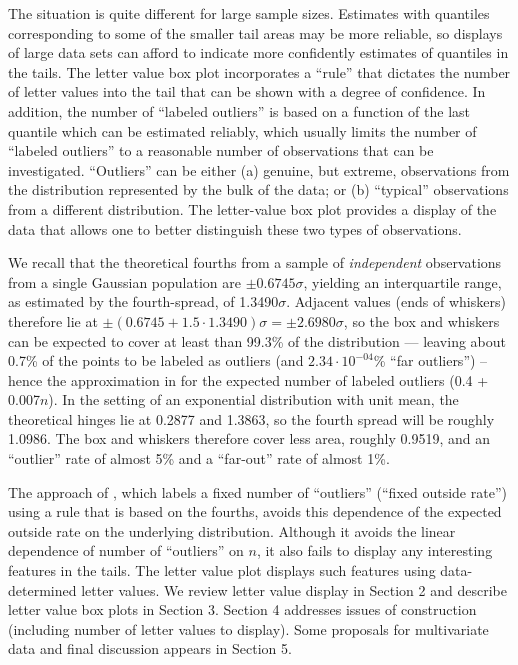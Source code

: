 \documentclass[oneside]{article}
\begin{document}
The situation is quite different for large sample sizes.
Estimates with quantiles corresponding to some of the smaller 
tail areas may be more reliable, so displays of large data sets 
can afford to indicate more confidently estimates of quantiles 
in the tails.  The letter
value box plot incorporates a ``rule'' that dictates the number of
letter values into the tail that can be shown with a degree of
confidence.  In addition, the number of ``labeled outliers'' is 
based on a function of the last quantile which can be estimated
reliably, which usually limits the number of ``labeled outliers'' 
to a reasonable number of observations that can be investigated.
``Outliers'' can be either (a) genuine, but extreme, observations
from the distribution represented by the bulk of the data; or 
(b) ``typical'' observations from a different distribution.
The letter-value box plot provides a display of the data that
allows one to better distinguish these two types of observations.

We recall that the theoretical fourths from a sample of
\textit{independent} observations from a single Gaussian 
population are $\pm  0.6745\sigma$, yielding an interquartile 
range, as estimated by the fourth-spread, of 1.3490$\sigma$.
Adjacent values (ends of whiskers) therefore lie at
$\pm (0.6745 + 1.5 \cdot 1.3490)\sigma = \pm 2.6980\sigma$,
so the box and whiskers can be expected to cover 
at least than 99.3\% of the distribution --- leaving 
about 0.7\% of the points to be labeled as outliers 
(and $2.34 \cdot 10^{-04}$\% ``far outliers'') -- hence the
approximation in \citet[34]{dchlv} for the expected 
number of labeled outliers (0.4 + 0.007$n$).
In the setting of an exponential distribution with unit mean, 
the theoretical hinges lie at 0.2877 and 1.3863, so the fourth
spread will be roughly 1.0986.  The box and whiskers therefore
cover less area, roughly 0.9519, and an ``outlier'' rate
of almost 5\% and a ``far-out'' rate of almost 1\%.

The approach of \citet{dchbi}, which
labels a fixed number of ``outliers'' (``fixed outside rate'')
using a rule that is based on the fourths, avoids this dependence 
of the expected outside rate on the underlying distribution.
Although it avoids the linear dependence of number of ``outliers''
on $n$, it also fails to display any interesting features in
the tails.  The letter value plot displays such features using
data-determined letter values.  We review letter value display
in Section 2 and describe letter value box plots in Section 3.
Section 4 addresses issues of construction (including number
of letter values to display). Some proposals for multivariate
data and final discussion appears in Section 5.
\end{document}
